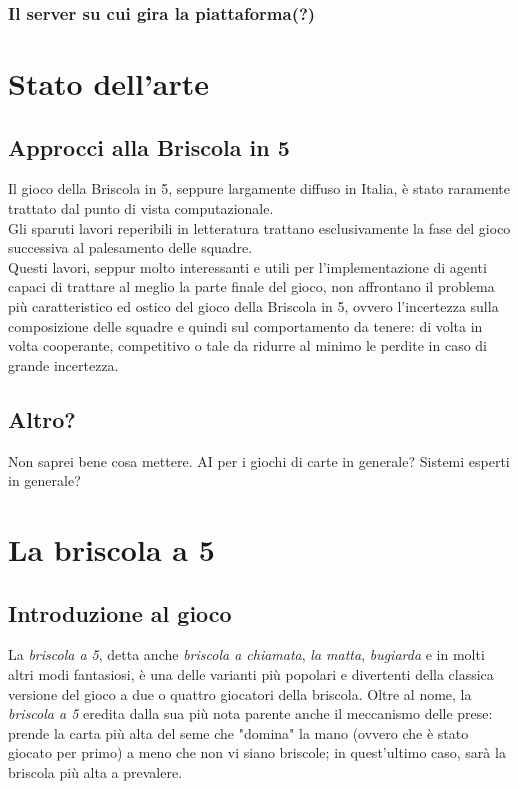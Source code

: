 \documentclass[runningheads,a4paper]{llncs}
\begin{document}
\subsubsection{Il server su cui gira la piattaforma(?)}

\section{Stato dell'arte}
\subsection{Approcci alla Briscola in 5}
Il gioco della Briscola in 5, seppure largamente diffuso in Italia, è stato raramente trattato dal punto di vista computazionale.\\
Gli sparuti lavori reperibili in letteratura trattano esclusivamente la fase del gioco successiva al palesamento delle squadre.\\
Questi lavori, seppur molto interessanti e utili per l'implementazione di agenti capaci di trattare al meglio la parte finale del gioco, non affrontano il problema più caratteristico ed ostico del gioco della Briscola in 5, ovvero l'incertezza sulla composizione delle squadre e quindi sul comportamento da tenere: di volta in volta cooperante, competitivo o tale da ridurre al minimo le perdite in caso di grande incertezza.


\subsection{Altro?}
Non saprei bene cosa mettere.
AI per i giochi di carte in generale?
Sistemi esperti in generale?


\section{La briscola a 5}
\subsection{Introduzione al gioco}

La \emph{briscola a 5}, detta anche \emph{briscola a chiamata}, \emph{la matta}, \emph{bugiarda} e in molti altri modi fantasiosi, è una delle varianti più popolari e divertenti della classica versione del gioco a due o quattro giocatori della briscola.
Oltre al nome, la \emph{briscola a 5} eredita dalla sua più nota parente anche il meccanismo delle prese: prende la carta più alta del seme che "domina" la mano (ovvero che è stato giocato per primo) a meno che non vi siano briscole; in quest'ultimo caso, sarà la briscola più alta a prevalere.
\end{document}

